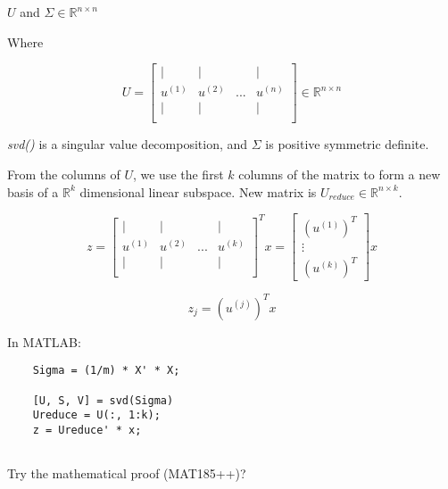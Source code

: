 \documentclass{article}
\begin{document}
$U$ and $\Sigma \in \mathbb{R}^{n \times n}$

Where 

\begin{equation}
    U = \begin{bmatrix}
    \vert & \vert & & \vert \\
    u^{(1)} & u^{(2)} &...& u^{(n)} \\
    \vert & \vert & & \vert \\
    \end{bmatrix} \in \mathbb{R}^{n \times n}
\end{equation}


\textit{svd()} is a singular value decomposition, and $\Sigma$ is positive symmetric definite.


From the columns of $U$, we use the first $k$ columns of the matrix to form a new basis of a $\mathbb{R}^k$ dimensional linear subspace. New matrix is $U_{reduce} \in \mathbb{R}^{n \times k}$.

\begin{equation}
    z = \begin{bmatrix} 
    \vert & \vert & & \vert \\
    u^{(1)} & u^{(2)} &...& u^{(k)} \\
    \vert & \vert & & \vert \\
    \end{bmatrix} ^T x  = 
    \begin{bmatrix} 
    \left    (u^{(1)}\right)^T
    
    \\
    \vdots
    \\
    \left    (u^{(k)}\right)^T
    
    \end{bmatrix} x
    
\end{equation}

\begin{equation}
    z_j = (u^{(j)})^T x
\end{equation}

In MATLAB:

\begin{verbatim}
    Sigma = (1/m) * X' * X;
    
    [U, S, V] = svd(Sigma)
    Ureduce = U(:, 1:k);
    z = Ureduce' * x;
    
\end{verbatim}

Try the mathematical proof (MAT185++)?
\end{document}
